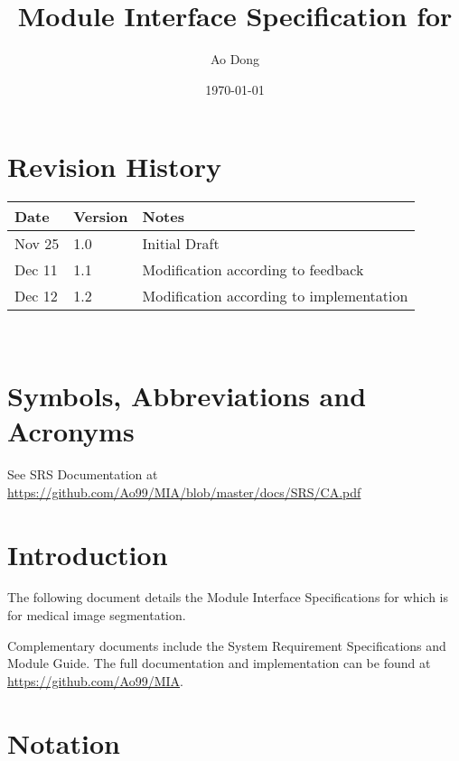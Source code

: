 \documentclass[12pt, titlepage]{article}
\begin{document}
\title{Module Interface Specification for \progname}

\author{Ao Dong}

\date{\today}

\maketitle


\section{Revision History}

\begin{tabularx}{\textwidth}{p{3cm}p{2cm}X}
\toprule {\bf Date} & {\bf Version} & {\bf Notes}\\
\midrule
Nov 25 & 1.0 & Initial Draft\\
Dec 11 & 1.1 & Modification according to feedback\\
Dec 12 & 1.2 & Modification according to implementation\\
\bottomrule
\end{tabularx}

~\newpage

\section{Symbols, Abbreviations and Acronyms}

See SRS Documentation at
\url{https://github.com/Ao99/MIA/blob/master/docs/SRS/CA.pdf}

\newpage

\tableofcontents

\newpage


\section{Introduction}

The following document details the Module Interface Specifications for
\progname{} which is for medical image segmentation.

Complementary documents include the System Requirement Specifications
and Module Guide.  The full documentation and implementation can be
found at \url{https://github.com/Ao99/MIA}.

\section{Notation}
\end{document}
